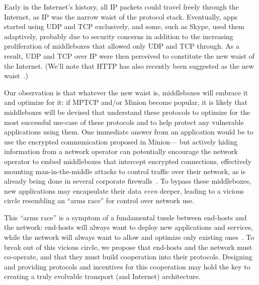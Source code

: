 Early in the Internet's history,
all IP packets could travel freely through the Internet, as IP was the narrow waist of
the protocol stack. 
Eventually, 
apps started using UDP and TCP exclusively,
and some, such as Skype, used them adaptively,
probably due to security concerns
in addition to the increasing proliferation of middleboxes that allowed only UDP and TCP through.
As a result, UDP and TCP over IP were then perceived to constitute the new waist of the Internet.
(We'll note that HTTP has also recently
been suggested as the new waist~\cite{popa10http}.) 

Our observation is that
whatever the new waist is,
middleboxes will embrace it and optimize for it: 
if MPTCP and/or Minion become popular, 
it is likely that middleboxes will be devised that understand these protocols
to optimize for the most successful use-case of these protocols
and to help protect any vulnerable applications using them.
One immediate answer from an application would be to
use the encrypted communication proposed in Minion---%
but actively hiding information from a network operator
can potentially encourage the network operator
to embed middleboxes that intercept encrypted connections,
effectively mounting man-in-the-middle attacks
to control traffic over their network,
as is already being done in several corporate firewalls~\cite{marko10using}.
To bypass these middleboxes,
new applications may encapsulate their data {\em even} deeper,
leading to a vicious circle resembling an ``arms race'' for control
over network use.

This ``arms race'' is a symptom of a fundamental tussle between
end-hosts and the network: end-hosts will always want to deploy new
applications and services, while the network will always want to allow and optimize only
existing ones~\cite{tussle}.
To break out of this vicious circle,
we propose that
end-hosts and the network must co-operate,
and that they must build cooperation into their protocols.
Designing and providing protocols and incentives for this cooperation may hold the key to creating a
truly evolvable transport (and Internet) architecture.
